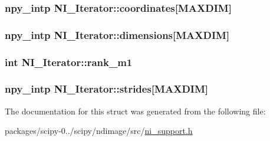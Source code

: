 \subsubsection[{coordinates}]{\setlength{\rightskip}{0pt plus 5cm}npy\+\_\+intp N\+I\+\_\+\+Iterator\+::coordinates\mbox{[}{\bf M\+A\+X\+D\+I\+M}\mbox{]}}\label{structNI__Iterator_a49cabc4ddd05ec40e2f41c820536c3df}
\hypertarget{structNI__Iterator_a8ae5515b3c5daafcce2eca2b6074b987}{}
\subsubsection[{dimensions}]{\setlength{\rightskip}{0pt plus 5cm}npy\+\_\+intp N\+I\+\_\+\+Iterator\+::dimensions\mbox{[}{\bf M\+A\+X\+D\+I\+M}\mbox{]}}\label{structNI__Iterator_a8ae5515b3c5daafcce2eca2b6074b987}
\hypertarget{structNI__Iterator_aad24039ebd2a945a1998806b7cfb8414}{}
\subsubsection[{rank\+\_\+m1}]{\setlength{\rightskip}{0pt plus 5cm}int N\+I\+\_\+\+Iterator\+::rank\+\_\+m1}\label{structNI__Iterator_aad24039ebd2a945a1998806b7cfb8414}
\hypertarget{structNI__Iterator_acf7314541d32adec17c07a026171c09d}{}
\subsubsection[{strides}]{\setlength{\rightskip}{0pt plus 5cm}npy\+\_\+intp N\+I\+\_\+\+Iterator\+::strides\mbox{[}{\bf M\+A\+X\+D\+I\+M}\mbox{]}}\label{structNI__Iterator_acf7314541d32adec17c07a026171c09d}


The documentation for this struct was generated from the following file\+:\begin{DoxyCompactItemize}
\item 
packages/scipy-\/0../scipy/ndimage/src/\hyperlink{ni__support_8h}{ni\+\_\+support.\+h}\end{DoxyCompactItemize}
